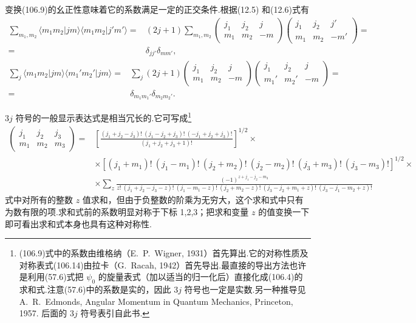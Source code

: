 变换(106.9)的幺正性意味着它的系数满足一定的正交条件.根据(12.5) 和(12.6)式有
\begin{equation}
\begin{aligned}
  \sum_{m_1,m_2}\langle m_1m_2|jm\rangle\langle m_1m_2|j'm'\rangle
  ={}&(2j+1)\sum_{m_1,m_2}
  \left(\begin{array}{ccc}j_1&j_2&j\\m_1&m_2&-m\end{array}\right)
  \left(\begin{array}{ccc}j_1&j_2&j'\\m_1&m_2&-m'\end{array}\right)=\\
  ={}&\delta_{jj'}\delta_{mm'},
\end{aligned}
\end{equation}
\begin{equation}
\begin{aligned}
  \sum_j\langle m_1m_2|jm\rangle\langle m_1'm_2'|jm\rangle
  ={}&\sum_j(2j+1)
  \left(\begin{array}{ccc}j_1&j_2&j\\m_1&m_2&-m\end{array}\right)
  \left(\begin{array}{ccc}j_1&j_2&j\\m_1'&m_2'&-m\end{array}\right)=\\
  ={}&\delta_{m_1m_1'}\delta_{m_2m_2'}.
\end{aligned}
\end{equation}

$3j$ 符号的一般显示表达式是相当冗长的.它可写成\footnote{(106.9)式中的系数由维格纳（E.~P.~Wigner, 1931）首先算出.它的对称性质及对称表式(106.14)由拉卡（G.~Racah, 1942）首先导出.最直接的导出方法也许是利用(57.6)式把 $\psi_0$ 的旋量表式（加以适当的归一化后）直接化成(106.4)的求和式.注意(57.6)中的系数是实的，因此 $3j$ 符号也一定是实数.另一种推导见 A.~R.~Edmonds, Angular Momentum in Quantum Mechanics, Princeton, 1957. 后面的 $3j$ 符号表引自此书.}
\begin{equation}
\begin{aligned}
  \left(\begin{array}{ccc}j_1&j_2&j_3\\m_1&m_2&m_3\end{array}\right)
  ={}&\left[\frac{(j_1+j_2-j_3)!\ (j_1-j_2+j_3)!\ (-j_1+j_2+j_3)!}{(j_1+j_2+j_3+1)!}\right]^{1/2}\times\\
  &\times\left[(j_1+m_1)!\ (j_1-m_1)!\ (j_2+m_2)!\ (j_2-m_2)!\ (j_3+m_3)!\ (j_3-m_3)!\right]^{1/2}\times\\
  &\times\sum_z\tfrac{(-1)^{z+j_1-j_2-m_3}}{z!\ (j_1+j_2-j_3-z)!\ (j_1-m_1-z)!\ (j_2+m_2-z)!\ (j_3-j_2+m_1+z)!\ (j_3-j_1-m_2+z)!}
\end{aligned}
\end{equation}
式中对所有的整数 $z$ 值求和，但由于负整数的阶乘为无穷大，这个求和式中只有为数有限的项.求和式前的系数明显对称于下标 1,2,3；把求和变量 $z$ 的值变换一下即可看出求和式本身也具有这种对称性.

